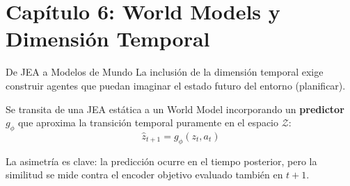 \documentclass[aspectratio=169, 12pt]{beamer}
\begin{document}
\section{Capítulo 6: World Models y Dimensión Temporal}

\begin{frame}{De JEA a Modelos de Mundo}
La inclusión de la dimensión temporal exige construir agentes que puedan imaginar el estado futuro del entorno (planificar).

Se transita de una JEA estática a un World Model incorporando un \textbf{predictor $g_\phi$} que aproxima la transición temporal puramente en el espacio $\mathcal{Z}$:
\[
    \hat{z}_{t+1} = g_\phi(z_t, a_t)
\]

La asimetría es clave: la predicción ocurre en el tiempo posterior, pero la similitud se mide contra el encoder objetivo evaluado también en $t+1$.
\end{frame}
\end{document}
